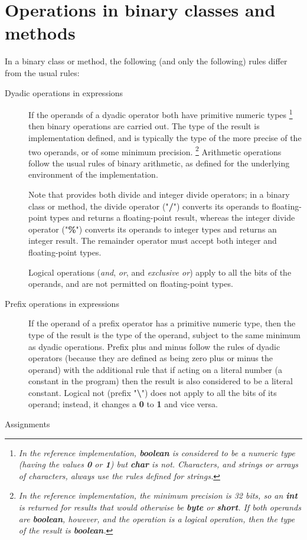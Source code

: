 \section{Operations in binary classes and methods}\label{refbindif}
 
In a binary class or method, the following (and only the following)
rules differ from the usual rules:
\begin{description}
\item[Dyadic operations in expressions]
 
If the operands of a dyadic operator both have primitive numeric types
\footnote{
\emph{In the reference implementation, \textbf{boolean} is considered to
be a numeric type (having the values \textbf{0} or \textbf{1})
but \textbf{char} is not.
Characters, and strings or arrays of characters, always use the rules
defined for \nr{} strings.}
}
then binary operations are carried out.  The type of the result is
implementation defined, and is typically the type of the more precise of
the two operands, or of some minimum precision.
\footnote{
\emph{In the reference implementation, the minimum precision is 32 bits,
so an \textbf{int} is returned for results that would otherwise
be \textbf{byte} or \textbf{short}.
If both operands are \textbf{boolean}, however, and the operation is a
logical operation, then the type of the result
is \textbf{boolean}.}
}
Arithmetic operations follow the usual rules of binary arithmetic, as
defined for the underlying environment of the implementation.
 
Note that \nr{} provides both divide and integer divide operators; in
a binary class or method, the divide operator ("\textbf{/}")
converts its operands to floating-point types and returns a
floating-point result, whereas the integer divide operator
("\textbf{\%}") converts its operands to integer types and
returns an integer result.
The remainder operator must accept both integer and floating-point
types.
 
Logical operations (\emph{and}, \emph{or}, and \emph{exclusive
or}) apply to all the bits of the operands, and are not permitted
on floating-point types.
\item[Prefix operations in expressions]
 
If the operand of a prefix operator has a primitive numeric type, then
the type of the result is the type of the operand, subject to
the same minimum as dyadic operations.
Prefix plus and minus follow the rules of dyadic operators (because they
are defined as being zero plus or minus the operand) with the additional
rule that if acting on a literal number (a constant in the program) then
the result is also considered to be a literal constant.
Logical not (prefix "\textbf{\textbackslash }") does not apply to all
the bits of its operand; instead, it changes a \textbf{0}
to \textbf{1} and vice versa.
\item[Assignments]
 

\end{description}
